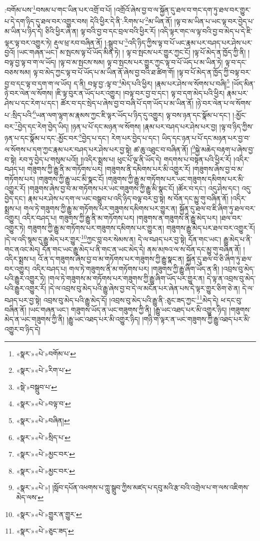:བགོམ་པས་\footnote{«སྣར་»«པེ་»བགོམ་པ་}བསམ་པ་གང་ཡིན་པར་འགྲོ་བ་པོ། །འགྲོའོ་ཞེས་བྱ་བ་ལ་སྐྱོན་དུ་ཐལ་བ་གང་དག་ཏུ་ཐལ་བར་གྱུར་པ་དེ་དག་ཉིད་དུ་ཐལ་བར་འགྱུར་བས། དེའི་ཕྱིར་དེ་ནི་:རིགས་པ་\footnote{«སྣར་»«པེ་»རིག་པ་}མ་ཡིན་ནོ། །ལྟ་བ་མ་ཡིན་པ་ཡང་ལྟ་བར་བྱེད་པ་མ་ཡིན་པ་ཉིད་དེ། ཅིའི་ཕྱིར་ཞེ་ན། ལྟ་བའི་བྱ་བ་དང་བྲལ་བའི་ཕྱིར་རོ། །འདི་ལྟར་གང་ལ་ལྟ་བའི་བྱ་བ་མེད་པ་དེ་ཇི་ལྟར་ལྟ་བར་འགྱུར་ཏེ། རྡུལ་ཕྲ་རབ་བཞིན་ནོ། །:སྒྲུབ་པ་\footnote{«སྡེ་»བསྒྲུབ་པ་}འདི་ཉིད་ཀྱིས་ལྟ་བ་པོ་ཡང་རྣམ་པར་བཤད་པར་ཤེས་པར་བྱའོ། །ཡང་གཞན་ཡང་། མ་སྤངས་ལྟ་པོ་ཡོད་མིན་ཏེ། །
ལྟ་བ་སྤངས་པར་གྱུར་ཀྱང་ངོ། །ལྟ་པོ་མེད་ན་ཁྱོད་ཀྱི་ནི། །བལྟ་བྱ་ལྟ་བ་ག་ལ་ཡོད། །ལྟ་བ་མ་སྤངས་སམ། ལྟ་བ་སྤངས་པར་གྱུར་ཀྱང་ལྟ་བ་པོ་ཡོད་པ་མ་ཡིན་ཏེ། ལྟ་བ་དང་བཅས་སམ། ལྟ་བ་མེད་ཀྱང་ལྟ་བ་པོ་ཡོད་པ་མ་ཡིན་ནོ་ཞེས་བྱ་བའི་ཐ་ཚིག་གོ། །ལྟ་བ་པོ་མེད་ན་ཁྱོད་ཀྱི་བལྟ་བར་བྱ་བ་དང་ལྟ་བ་དག་ག་ལ་ཡོད། ད་ནི། བལྟ་བྱ་:ལྟ་བ་\footnote{«སྣར་»«པེ་»བལྟ་བ་}མེད་པའི་ཕྱིར། །རྣམ་པར་ཤེས་ལ་སོགས་པ་བཞི།\footnote{«སྣར་»«པེ་»བཞིན།} །ཡོད་མིན་ཉེ་བར་ལེན་ལ་སོགས། །ཇི་ལྟ་བུར་ན་ཡོད་པར་འགྱུར། །བལྟ་བར་བྱ་བ་དང་། ལྟ་བ་དག་མེད་པའི་ཕྱིར། རྣམ་པར་ཤེས་པ་དང་རེག་པ་དང་། ཚོར་བ་དང་སྲེད་པ་ཞེས་བྱ་བ་བཞི་པོ་དག་ཡོད་པ་མ་ཡིན་ནོ། །ཉེ་བར་ལེན་པ་ལ་སོགས་པ་:སྲིད་པའི་\footnote{«སྣར་»«པེ་»སྲིད་པ་}ཡན་ལག་ལྷག་མ་རྣམས་ཀྱང་ཇི་ལྟར་ཡོད་པ་ཉིད་དུ་འགྱུར། ལྟ་བས་ཉན་དང་སྣོམ་པ་དང་། །:མྱོང་བར་\footnote{«སྣར་»«པེ་»མྱང་བར་}བྱེད་དང་རེག་བྱེད་ཡིད། །ཉན་པ་པོ་དང་མཉན་ལ་སོགས། །རྣམ་པར་བཤད་པར་ཤེས་པར་བྱ། །ལྟ་བ་ཉིད་ཀྱིས་ཉན་པ་དང་སྣོམ་པ་དང་:མྱོང་བར་\footnote{«སྣར་»«པེ་»མྱང་བར་}བྱེད་པ་དང་། རེག་པར་བྱེད་པ་དང་། ཡིད་དང་ཉན་པ་པོ་དང་མཉན་པར་བྱ་བ་ལ་སོགས་པ་དག་ཀྱང་རྣམ་པར་བཤད་པར་ཤེས་པར་བྱ་སྟེ། ཚ་ཆུ་འཐུང་བ་བཞིན་ནོ། །\footnote{«སྣར་»«པེ་»། །སློབ་དཔོན་འཕགས་པ་ཀླུ་སྒྲུབ་ཀྱིས་མཛད་པ་དབུ་མའི་རྩ་བའི་འགྲེལ་པ་ག་ལས་འཇིགས་མེད་ལས་}སྐྱེ་མཆེད་བརྟག་པ་ཞེས་བྱ་བ་སྟེ། རབ་ཏུ་བྱེད་པ་གསུམ་པའོ།། །།འདིར་སྨྲས་པ། ཕུང་པོ་ལྔ་ནི་ཡོད་དེ། གདགས་པ་བསྟན་པའི་ཕྱིར་རོ། །འདིར་བཤད་པ། གཟུགས་ཀྱི་རྒྱུ་ནི་མ་གཏོགས་པར། །གཟུགས་ནི་དམིགས་པར་མི་འགྱུར་རོ། །གཟུགས་ཞེས་བྱ་བ་མ་གཏོགས་པར། །གཟུགས་ཀྱི་རྒྱུ་ཡང་མི་སྣང་ངོ། །གཟུགས་ཀྱི་རྒྱུ་མ་གཏོགས་པར་ཡང་གཟུགས་དམིགས་པར་མི་འགྱུར་རོ། །གཟུགས་ཞེས་བྱ་བ་མ་གཏོགས་པར་ཡང་གཟུགས་ཀྱི་རྒྱུ་མི་སྣང་ངོ། །ཚོར་བ་དང་། འདུ་ཤེས་དང་། འདུ་བྱེད་དང་། རྣམ་པར་ཤེས་པ་དག་ལ་ཡང་བསྒྲུབ་པ་འདི་ཉིད་བལྟ་བར་བྱ་སྟེ། ས་བོན་དང་མྱུ་གུ་བཞིན་ནོ། །འདིར་སྨྲས་པ། གལ་ཏེ་གཟུགས་ཀྱི་རྒྱུ་མ་གཏོགས་པར་གཟུགས་དམིགས་པར་གྱུར་ན། སྐྱོན་དུ་ཐལ་བ་ཇི་ཞིག་ཏུ་ཐལ་བར་འགྱུར། འདིར་བཤད་པ། གཟུགས་ཀྱི་རྒྱུ་ནི་མ་གཏོགས་པར། །གཟུགས་ན་གཟུགས་ནི་རྒྱུ་མེད་པར། །ཐལ་བར་འགྱུར་ཏེ། གཟུགས་ཀྱི་རྒྱུ་མ་གཏོགས་པར་གཟུགས་དམིགས་པར་གྱུར་ན། གཟུགས་རྒྱུ་མེད་པར་ཐལ་བར་འགྱུར་རོ། །དེ་ལ་འདི་སྙམ་དུ་རྒྱུ་མེད་པར་གྱུར་\footnote{«སྣར་»«པེ་»གྱུར་ན་གྱུར་}ཀྱང་བླ་བར་སེམས་ན། དེ་ལ་བཤད་པར་བྱ་སྟེ། དོན་གང་ཡང་། རྒྱུ་མེད་པ་ནི་གང་ནའང་མེད། དོན་གང་ཡང་རྒྱུ་མེད་པ་ནི་གང་ན་ཡང་མེད་དེ། ནམ་མཁའ་ལ་ས་བོན་དང་མྱུ་གུ་བཞིན་ནོ། །འདིར་སྨྲས་པ། འོ་ན་ད་གཟུགས་ཞེས་བྱ་བ་མ་གཏོགས་པར་གཟུགས་ཀྱི་རྒྱུ་སྣང་ན། སྐྱོན་དུ་ཐལ་བ་ཅི་ཞིག་ཏུ་ཐལ་བར་འགྱུར། འདིར་བཤད་པ། གལ་ཏེ་གཟུགས་ནི་མ་གཏོགས་པར། །གཟུགས་ཀྱི་རྒྱུ་ཞིག་ཡོད་ན་ནི། །འབྲས་བུ་མེད་པའི་རྒྱུར་འགྱུར་ཏེ། །གལ་ཏེ་གཟུགས་མ་གཏོགས་པར་གཟུགས་ཀྱི་རྒྱུ་ཞིག་ཡོད་པར་གྱུར་ན། དེ་ལྟ་ན་འབྲས་བུ་མེད་པའི་རྒྱུར་འགྱུར་རོ། །དེ་ལ་འབྲས་བུ་མེད་པའི་རྒྱུ་ཞེས་བྱ་བ་དེ་ལ་མངོན་པར་ཞེན་པས་དེ་ལྟར་གྱུར་ཅིག་ཅེ་ན། དེ་ལ་བཤད་པར་བྱ་སྟེ། འབྲས་བུ་མེད་པའི་རྒྱུ་མེད་དོ། །འབྲས་བུ་མེད་པའི་རྒྱུ་ནི་:ཅུང་ཟད་ཀྱང་\footnote{«སྣར་»«པེ་»ཅུང་ཟད་}མེད་དེ། ཕ་དང་བུ་བཞིན་ནོ། །ཡང་གཞན་ཡང་། གཟུགས་ཡོད་ན་ཡང་གཟུགས་ཀྱི་ནི། །རྒྱུ་ཡང་འཐད་པར་མི་འགྱུར་ཉིད། །གཟུགས་མེད་ན་ཡང་གཟུགས་ཀྱི་ནི། །རྒྱུ་ཡང་འཐད་པར་མི་འགྱུར་ཉིད། །གཉི་ག་ལྟར་ན་ཡང་གཟུགས་ཀྱི་རྒྱུ་འཐད་པར་མི་འགྱུར་བ་ཉིད་དེ། 